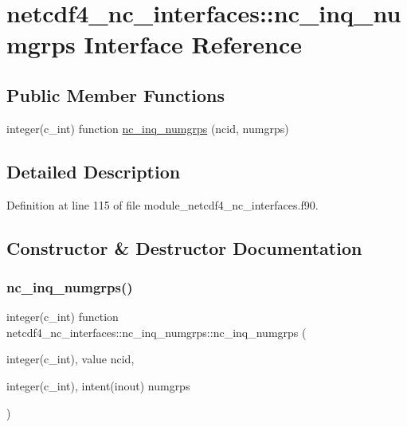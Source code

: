 \hypertarget{interfacenetcdf4__nc__interfaces_1_1nc__inq__numgrps}{}\section{netcdf4\+\_\+nc\+\_\+interfaces\+:\+:nc\+\_\+inq\+\_\+numgrps Interface Reference}
\label{interfacenetcdf4__nc__interfaces_1_1nc__inq__numgrps}
\subsection*{Public Member Functions}
\begin{DoxyCompactItemize}
\item 
integer(c\+\_\+int) function \hyperlink{interfacenetcdf4__nc__interfaces_1_1nc__inq__numgrps_adfd96e8cd88eb0ce5828d47b6c484d6c}{nc\+\_\+inq\+\_\+numgrps} (ncid, numgrps)
\end{DoxyCompactItemize}


\subsection{Detailed Description}


Definition at line 115 of file module\+\_\+netcdf4\+\_\+nc\+\_\+interfaces.\+f90.



\subsection{Constructor \& Destructor Documentation}
\mbox{\label{interfacenetcdf4__nc__interfaces_1_1nc__inq__numgrps_adfd96e8cd88eb0ce5828d47b6c484d6c}} 
\subsubsection{\texorpdfstring{nc\+\_\+inq\+\_\+numgrps()}{nc\_inq\_numgrps()}}
{\footnotesize\ttfamily integer(c\+\_\+int) function netcdf4\+\_\+nc\+\_\+interfaces\+::nc\+\_\+inq\+\_\+numgrps\+::nc\+\_\+inq\+\_\+numgrps (\begin{DoxyParamCaption}\item[{integer(c\+\_\+int), value}]{ncid,  }\item[{integer(c\+\_\+int), intent(inout)}]{numgrps }\end{DoxyParamCaption})}



